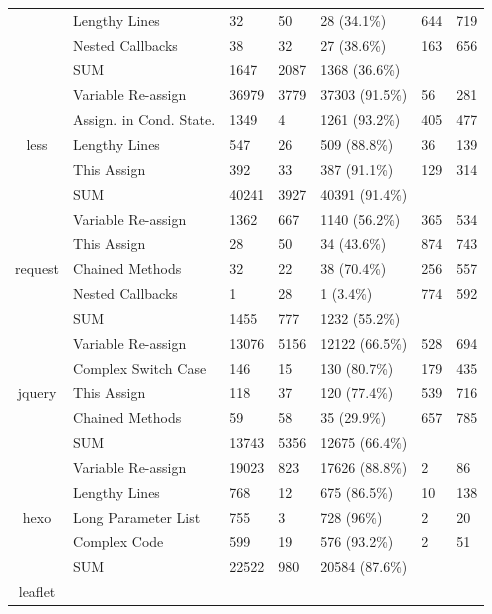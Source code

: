 {\begin{table}[!htbp]
{\begin{tabular}{c|l|l|l|m{2cm}|m{2cm}|m{2cm}}
		& Lengthy Lines & 32 & 50 & 28 (34.1\%) & 644 & 719 \\ \cline{2-7}
		& Nested Callbacks & 38 & 32 & 27 (38.6\%) & 163 & 656 \\ \cline{2-7}
		& SUM & 1647 & 2087 & 1368 (36.6\%) & & \\ \hline
		\multirow{5}{*}{less}
		& Variable Re-assign & 36979 & 3779 & 37303 (91.5\%) & 56 & 281 \\ \cline{2-7}
		& Assign. in Cond. State. & 1349 & 4 & 1261 (93.2\%) & 405 & 477 \\ \cline{2-7}
		& Lengthy Lines & 547 & 26 & 509 (88.8\%) & 36 & 139 \\ \cline{2-7}
		& This Assign & 392 & 33 & 387 (91.1\%) & 129 & 314 \\ \cline{2-7}
		& SUM & 40241 & 3927 & 40391 (91.4\%) & & \\ \hline
		\multirow{5}{*}{request}
		& Variable Re-assign & 1362 & 667 & 1140 (56.2\%) & 365 & 534 \\ \cline{2-7}
		& This Assign & 28 & 50 & 34 (43.6\%) & 874 & 743 \\ \cline{2-7}
		& Chained Methods & 32 & 22 & 38 (70.4\%) & 256 & 557 \\ \cline{2-7}
		& Nested Callbacks & 1 & 28 & 1 (3.4\%) & 774 & 592 \\ \cline{2-7}
		& SUM & 1455 & 777 & 1232 (55.2\%) & & \\ \hline
		\multirow{5}{*}{jquery}
		& Variable Re-assign & 13076 & 5156 & 12122 (66.5\%) & 528 & 694 \\ \cline{2-7}
		& Complex Switch Case & 146 & 15 & 130 (80.7\%) & 179 & 435 \\ \cline{2-7}
		& This Assign & 118 & 37 & 120 (77.4\%) & 539 & 716 \\ \cline{2-7}
		& Chained Methods & 59 & 58 & 35 (29.9\%) & 657 & 785 \\ \cline{2-7}
		& SUM & 13743 & 5356 & 12675 (66.4\%) & & \\ \hline
		\multirow{5}{*}{hexo}
		& Variable Re-assign & 19023 & 823 & 17626 (88.8\%) & 2 & 86 \\ \cline{2-7}
		& Lengthy Lines & 768 & 12 & 675 (86.5\%) & 10 & 138 \\ \cline{2-7}
		& Long Parameter List & 755 & 3 & 728 (96\%) & 2 & 20 \\ \cline{2-7}
		& Complex Code & 599 & 19 & 576 (93.2\%) & 2 & 51 \\ \cline{2-7}
		& SUM & 22522 & 980 & 20584 (87.6\%) & & \\ \hline
		\multirow{5}{*}{leaflet}

\end{tabular}}
\end{table}}
